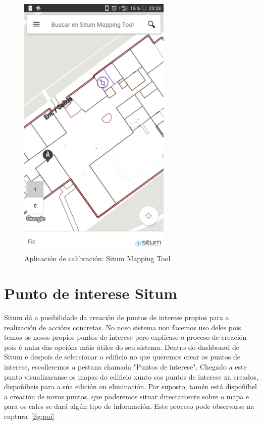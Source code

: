 \begin{figure}[tb] 
	\begin{center}
		\includegraphics[width=0.65\textwidth]{figures/Capturas/mapping_tool}
		\caption{Aplicación de calibración: Situm Mapping Tool}
		\label{fig:mapping_tool}
	\end{center}
\end{figure}

\section{Punto de interese Situm}
Situm dá a posibilidade da creación de puntos de interese propios para a realización de accións concretas. No noso sistema non facemos uso deles pois temos os nosos propios puntos de interese pero explícase o proceso de creación pois é unha das opcións máis útiles do seu sistema.
Dentro do dashboard de Situm e despois de seleccionar o edificio no que queremos crear os puntos de interese, escolleremos a pestana chamada "Puntos de interese". Chegado a este punto visualizaranse os mapas do edificio xunto cos puntos de interese xa creados, dispoñíbeis para a súa edición ou eliminación. Por suposto, tamén está dispoñíbel a creación de novos puntos, que poderemos situar directamente sobre o mapa e para os cales se dará algún tipo de información. Este proceso pode observarse na captura~\ref{fig:poi}

